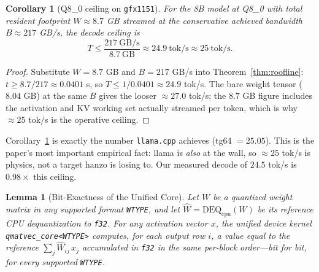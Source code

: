 \documentclass[11pt]{article}
\newtheorem{lemma}{Lemma}
\newtheorem{corollary}{Corollary}
\begin{document}
\begin{corollary}[Q8\_0 ceiling on \texttt{gfx1151}]
\label{cor:q80}
For the 8B model at Q8\_0 with total resident footprint $W \approx 8.7$ GB streamed at the conservative achieved bandwidth $B \approx 217$ GB/s, the decode ceiling is
\[
T \leq \frac{217\ \text{GB/s}}{8.7\ \text{GB}} \approx 24.9\ \text{tok/s} \approx 25\ \text{tok/s}.
\]
\end{corollary}

\begin{proof}
Substitute $W = 8.7$ GB and $B = 217$ GB/s into Theorem~\ref{thm:roofline}: $t \geq 8.7/217 \approx 0.0401$ s, so $T \leq 1/0.0401 \approx 24.9$ tok/s. The bare weight tensor ($8.04$ GB) at the same $B$ gives the looser $\approx 27.0$ tok/s; the $8.7$ GB figure includes the activation and KV working set actually streamed per token, which is why $\approx 25$ tok/s is the operative ceiling.
\end{proof}

Corollary~\ref{cor:q80} is exactly the number \texttt{llama.cpp} achieves (tg64 $=25.05$). This is the paper's most important empirical fact: llama is \emph{also} at the wall, so $\approx 25$ tok/s is physics, not a target hanzo is losing to. Our measured decode of $24.5$ tok/s is $0.98\times$ this ceiling.

\begin{lemma}[Bit-Exactness of the Unified Core]
\label{lem:bitexact}
Let $W$ be a quantized weight matrix in any supported format \texttt{WTYPE}, and let $\hat W = \mathrm{DEQ}_{\text{cpu}}(W)$ be its reference CPU dequantization to \texttt{f32}. For any activation vector $x$, the unified device kernel \texttt{qmatvec\_core<WTYPE>} computes, for each output row $i$, a value equal to the reference $\sum_j \hat W_{ij}\, x_j$ accumulated in \texttt{f32} in the same per-block order---bit for bit, for every supported \texttt{WTYPE}.
\end{lemma}
\end{document}
